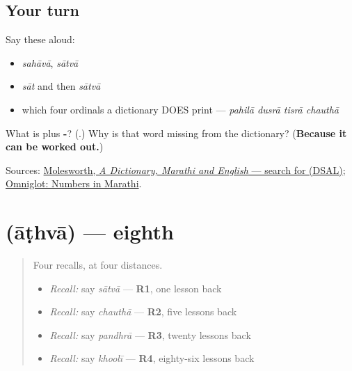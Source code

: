 \subsection*{Your turn}
Say these aloud:

\begin{itemize}
\raggedright
  \item \emph{sahāvā}, \emph{sātvā}
  \item \emph{sāt} and then \emph{sātvā}
  \item which four ordinals a dictionary DOES print — \emph{pahilā dusrā tisrā chauthā}
\end{itemize}

\begin{tcolorbox}[breakable,colback=teal!4,colframe=teal!35!black,title={Before you move on}]
What is \textbf{} plus \textbf{-}? (\textbf{}.) Why is that word missing from the dictionary? (\textbf{Because it can be worked out.})

Sources: \href{https://dsal.uchicago.edu/cgi-bin/app/molesworth\_query.py?qs=\%E0\%A4\%B8\%E0\%A4\%BE\%E0\%A4\%A4\%E0\%A4\%B5\%E0\%A4\%BE\&searchhws=yes}{Molesworth, \emph{A Dictionary, Marathi and English} — search for  (DSAL)}; \href{https://www.omniglot.com/language/numbers/marathi.htm}{Omniglot: Numbers in Marathi}.
\end{tcolorbox}
\section[\texorpdfstring{\mr{आठवा} (āṭhvā)}{आठवा (āṭhvā)}]{ (āṭhvā) — eighth}

\label{lesson:MR-C61-aathva}



\begin{quote}
Four recalls, at four distances.

\begin{itemize}
\raggedright
  \item \emph{Recall:} say \emph{sātvā} — \textbf{R1}, one lesson back
  \item \emph{Recall:} say \emph{chauthā} — \textbf{R2}, five lessons back
  \item \emph{Recall:} say \emph{pandhrā} — \textbf{R3}, twenty lessons back
  \item \emph{Recall:} say \emph{khoolī} — \textbf{R4}, eighty-six lessons back
\end{itemize}
\end{quote}

